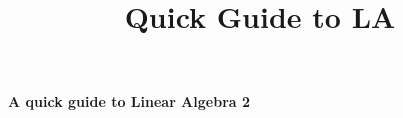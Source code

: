 \documentclass[6pt,landscape]{article}
\title{Quick Guide to LA}
\begin{document}
\raggedright
\tiny


\begin{center}
     \Large{\textbf{A quick guide to Linear Algebra 2}} \\
\end{center}
\begin{multicols}{5}
\setlength{\premulticols}{1pt}
\setlength{\postmulticols}{1pt}
\setlength{\multicolsep}{1pt}
\setlength{\columnsep}{2pt}




\newcommand{\kapitela}{eins}
\newcommand{\kapitelb}{zwei}
\newcommand{\kapitelc}{drei}
\newcommand{\kapiteld}{vier}
\newcommand{\kapitele}{fünf}
\newcommand{\kapitellf}{sechs}
\newcommand{\kapitelg}{sieben}
\newcommand{\kapitelh}{acht}
\newcommand{\kapiteli}{neun}
\newcommand{\kapitelj}{zehn}
\newcommand{\kapitelk}{elf}
\newcommand{\kapitell}{zwölf}
\newcommand{\kapitelm}{dreizehn}
\newcommand{\kapiteln}{vierzehn}
\newcommand{\kapitelo}{fünfzehn}
\newcommand{\kapitelp}{sechszehn}
\newcommand{\kapitelq}{siebzehn}
\newcommand{\kapitelr}{achtzehn}
\newcommand{\kapitels}{neunzehn}
\newcommand{\kapitelt}{zwanzig}
\newcommand{\kapitelu}{einundzwanzig}
\newcommand{\kapitelv}{zweiundzwanzig}
\newcommand{\kapitelw}{dreiundzwanzig}
\newcommand{\kapitelx}{vierundzwanzig}
\newcommand{\kapitely}{fünfundzwandig}
\newcommand{\kapitelz}{sechsundzwanzig}
\newcommand{\kapitelaa}{siebenundzwanzig}
\newcommand{\kapitelab}{achtundzwanzig}
\newcommand{\kapitelac}{neunundzwanzig}
\newcommand{\kapitelad}{dreißig}
\newcommand{\kapitelae}{einunddreißig}
\newcommand{\kapitelaf}{zweiunddreißig}
\newcommand{\kapitelag}{dreiundreißig}
\newcommand{\kapitelah}{vierunddreißig}
\newcommand{\kapitelai}{fünfunddreißig}
\newcommand{\kapitelaj}{sechsunddreißig}
\newcommand{\kapitelak}{siebenunddreißig}
\newcommand{\kapitelal}{achtunddreißig}
\newcommand{\kapitelam}{neununddreißig}
\newcommand{\kapitelan}{vierzig}
\newcommand{\kapitelao}{einundvierzig}
\newcommand{\kapitelap}{zweiundvierzig}
\newcommand{\kapitelaq}{dreiundvierzig}
\newcommand{\kapitelar}{vierundvierzig}
\newcommand{\kapitelas}{fünfundvierzig}
\newcommand{\kapitelat}{sechsundvierzig}
\newcommand{\kapitelau}{siebenundvierzig}
\newcommand{\kapitelav}{achtundvierzig}
\newcommand{\kapitelaw}{neunundvierzig}
\newcommand{\kapitelax}{fünfzig}
\newcommand{\kapitelay}{einundfünfzig}
\newcommand{\kapitelaz}{zweiundfünfzig}
\newcommand{\kapitelba}{dreiundfünfzig}
\newcommand{\kapitelbb}{vierundfünfzig}

\end{multicols}
\end{document}
